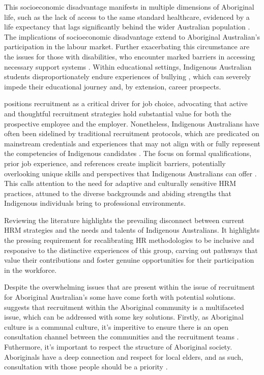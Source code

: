 \documentclass{article}
\begin{document}
This socioeconomic disadvantage manifests in multiple dimensions of Aboriginal life, such as the lack of access to the same standard healthcare, evidenced by a life expectancy that lags significantly behind the wider Australian population \parencite{leederAchievingEquityAustralian2003}. The implications of socioeconomic disadvantage extend to Aboriginal Australian's participation in the labour market. Further exacerbating this circumstance are the issues for those with disabilities, who encounter marked barriers in accessing necessary support systems \parencite{statisticsChapterDisability2011}. Within educational settings, Indigenous Australian students disproportionately endure experiences of bullying \parencite{coffinBullyingAboriginalContext2010}, which can severely impede their educational journey and, by extension, career prospects. 

\textcite{rynesImportanceRecruitmentJob1991} positions recruitment as a critical driver for job choice, advocating that active and thoughtful recruitment strategies hold substantial value for both the prospective employee and the employer. Nonetheless, Indigenous Australians have often been sidelined by traditional recruitment protocols, which are predicated on mainstream credentials and experiences that may not align with or fully represent the competencies of Indigenous candidates \parencite{pearsonExtendingBoundariesHuman2011}. The focus on formal qualifications, prior job experience, and references create implicit barriers, potentially overlooking unique skills and perspectives that Indigenous Australians can offer \parencite{pearsonExtendingBoundariesHuman2011}. This calls attention to the need for adaptive and culturally sensitive HRM practices, attuned to the diverse backgrounds and abiding strengths that Indigenous individuals bring to professional environments.

Reviewing the literature highlights the prevailing disconnect between current HRM strategies and the needs and talents of Indigenous Australians. It highlights the pressing requirement for recalibrating HR methodologies to be inclusive and responsive to the distinctive experiences of this group, carving out pathways that value their contributions and foster genuine opportunities for their participation in the workforce.

Despite the overwhelming issues that are present within the issue of recruitment for Aboriginal Australian's some have come forth with potential solutions. \textcite{raeDevelopingResearchPartnership2013} suggests that recruitment within the Aboriginal community is a multifaceted issue, which can be addressed with some key solutions. Firstly, as Aboriginal culture is a communal culture, it's imperitive to ensure there is an open consultation channel between the communities and the recruitment teams \parencite{raeDevelopingResearchPartnership2013}. Futhermore, it's important to respect the structure of Aboriginal society. Aboriginals have a deep connection and respect for local elders, and as such, consultation with those people should be a priority \parencite{raeDevelopingResearchPartnership2013}.
\end{document}
